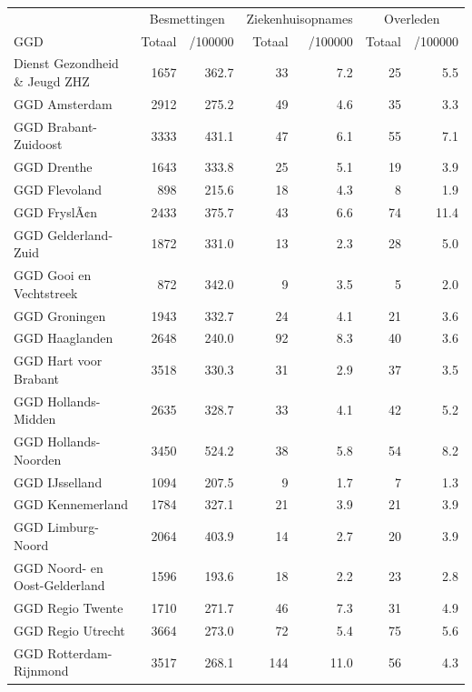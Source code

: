 \documentclass[
  english,
  man,floatsintext]{apa6}
\begin{document}
\begin{table}[H]
\centering\begingroup\fontsize{10}{12}\selectfont

\begin{threeparttable}
\begin{tabular}{lrrrrrr}
\toprule
\multicolumn{1}{c}{ } & \multicolumn{2}{c}{Besmettingen} & \multicolumn{2}{c}{Ziekenhuisopnames} & \multicolumn{2}{c}{Overleden} \\
\cmidrule(l{3pt}r{3pt}){2-3} \cmidrule(l{3pt}r{3pt}){4-5} \cmidrule(l{3pt}r{3pt}){6-7}
GGD & Totaal & /100000 & Totaal & /100000 & Totaal & /100000\\
\midrule
Dienst Gezondheid \& Jeugd ZHZ & 1657 & 362.7 & 33 & 7.2 & 25 & 5.5\\
GGD Amsterdam & 2912 & 275.2 & 49 & 4.6 & 35 & 3.3\\
GGD Brabant-Zuidoost & 3333 & 431.1 & 47 & 6.1 & 55 & 7.1\\
GGD Drenthe & 1643 & 333.8 & 25 & 5.1 & 19 & 3.9\\
GGD Flevoland & 898 & 215.6 & 18 & 4.3 & 8 & 1.9\\
GGD FryslÃ¢n & 2433 & 375.7 & 43 & 6.6 & 74 & 11.4\\
GGD Gelderland-Zuid & 1872 & 331.0 & 13 & 2.3 & 28 & 5.0\\
GGD Gooi en Vechtstreek & 872 & 342.0 & 9 & 3.5 & 5 & 2.0\\
GGD Groningen & 1943 & 332.7 & 24 & 4.1 & 21 & 3.6\\
GGD Haaglanden & 2648 & 240.0 & 92 & 8.3 & 40 & 3.6\\
GGD Hart voor Brabant & 3518 & 330.3 & 31 & 2.9 & 37 & 3.5\\
GGD Hollands-Midden & 2635 & 328.7 & 33 & 4.1 & 42 & 5.2\\
GGD Hollands-Noorden & 3450 & 524.2 & 38 & 5.8 & 54 & 8.2\\
GGD IJsselland & 1094 & 207.5 & 9 & 1.7 & 7 & 1.3\\
GGD Kennemerland & 1784 & 327.1 & 21 & 3.9 & 21 & 3.9\\
GGD Limburg-Noord & 2064 & 403.9 & 14 & 2.7 & 20 & 3.9\\
GGD Noord- en Oost-Gelderland & 1596 & 193.6 & 18 & 2.2 & 23 & 2.8\\
GGD Regio Twente & 1710 & 271.7 & 46 & 7.3 & 31 & 4.9\\
GGD Regio Utrecht & 3664 & 273.0 & 72 & 5.4 & 75 & 5.6\\
GGD Rotterdam-Rijnmond & 3517 & 268.1 & 144 & 11.0 & 56 & 4.3\\

\end{tabular}
\end{threeparttable}
\end{table}
\end{document}
